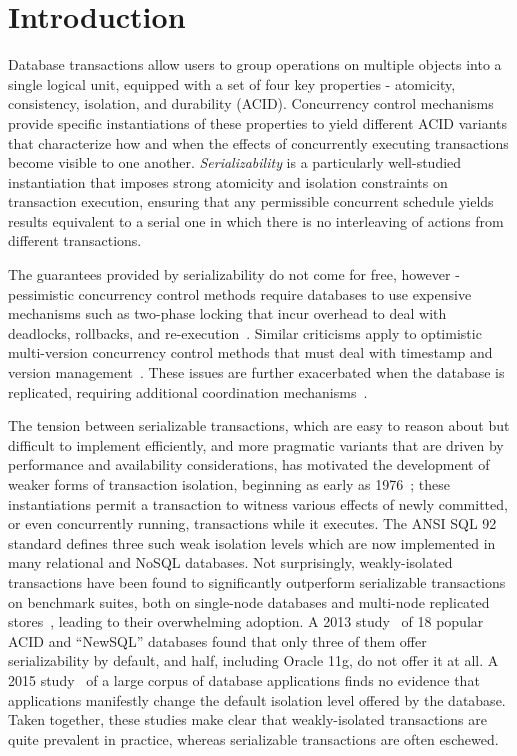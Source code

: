 \section{Introduction}

Database transactions allow users to group operations on multiple
objects into a single logical unit, equipped with a set of four key
properties - atomicity, consistency, isolation, and durability (ACID).
Concurrency control mechanisms provide specific instantiations of
these properties to yield different ACID variants that characterize
how and when the effects of concurrently executing transactions become
visible to one another.  \emph{Serializability} is a particularly
well-studied instantiation that imposes strong atomicity and isolation
constraints on transaction execution, ensuring that any permissible
concurrent schedule yields results equivalent to a serial one in which
there is no interleaving of actions from different transactions.

The guarantees provided by serializability do not come for free,
however - pessimistic concurrency control methods require databases to
use expensive mechanisms such as two-phase locking that incur overhead
to deal with deadlocks, rollbacks, and
re-execution~\cite{twopl,ullmanbook}.  Similar criticisms apply to
optimistic multi-version concurrency control methods that must deal
with timestamp and version management~\cite{BG81}.  These issues are
further exacerbated when the database is replicated, requiring
additional coordination
mechanisms~\cite{cap,sernotavlbl,bailishat,bernsigmod13}.

The tension between serializable transactions, which are easy to
reason about but difficult to implement efficiently, and more
pragmatic variants that are driven by performance and availability
considerations, has motivated the development of weaker forms of
transaction isolation, beginning as early as 1976~\cite{gray1976};
these instantiations permit a transaction to witness various effects
of newly committed, or even concurrently running, transactions while
it executes.  The ANSI SQL 92 standard defines three such weak
isolation levels which are now implemented in many relational and
NoSQL databases. Not surprisingly, weakly-isolated transactions have
been found to significantly outperform serializable transactions on
benchmark suites, both on single-node databases and multi-node
replicated stores~\cite{dbtuningbook,bailishat,bailisvldb}, leading to
their overwhelming adoption. A 2013 study~\cite{bailishotos} of 18
popular ACID and ``NewSQL'' databases found that only three of them
offer serializability by default, and half, including Oracle 11g, do
not offer it at all.  A 2015 study~\cite{bailisferal} of a large
corpus of database applications finds no evidence that applications
manifestly change the default isolation level offered by the
database. Taken together, these studies make clear that
weakly-isolated transactions are quite prevalent in practice, whereas
serializable transactions are often eschewed.

